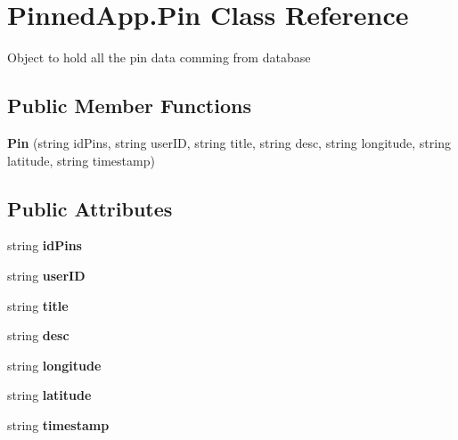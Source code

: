 \hypertarget{class_pinned_app_1_1_pin}{}\section{Pinned\+App.\+Pin Class Reference}
\label{class_pinned_app_1_1_pin}


Object to hold all the pin data comming from database  


\subsection*{Public Member Functions}
\begin{DoxyCompactItemize}
\item 
\mbox{\label{class_pinned_app_1_1_pin_a80318787a4cd3d67f87f14061661b8ab}} 
{\bfseries Pin} (string id\+Pins, string user\+ID, string title, string desc, string longitude, string latitude, string timestamp)
\end{DoxyCompactItemize}
\subsection*{Public Attributes}
\begin{DoxyCompactItemize}
\item 
\mbox{\label{class_pinned_app_1_1_pin_ae68042c371571e145e28c0779811026a}} 
string {\bfseries id\+Pins}
\item 
\mbox{\label{class_pinned_app_1_1_pin_aad5cde0f3d2b9998b6d83c4599e412a8}} 
string {\bfseries user\+ID}
\item 
\mbox{\label{class_pinned_app_1_1_pin_ab901fcdf182213b9dc677b1294199640}} 
string {\bfseries title}
\item 
\mbox{\label{class_pinned_app_1_1_pin_a48bf142a817a2596a9f032087903c2f6}} 
string {\bfseries desc}
\item 
\mbox{\label{class_pinned_app_1_1_pin_ab8128c9554ab6ee00d9f6a3135a0b92f}} 
string {\bfseries longitude}
\item 
\mbox{\label{class_pinned_app_1_1_pin_af2341e74480a480c6e46049d55b6173b}} 
string {\bfseries latitude}
\item 
\mbox{\label{class_pinned_app_1_1_pin_aa3ae5778d9e1586c0e4ea11b0798b96d}} 
string {\bfseries timestamp}
\end{DoxyCompactItemize}



